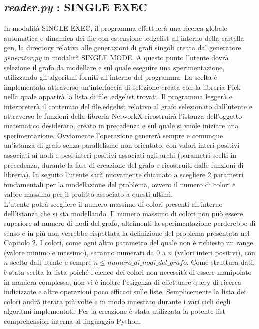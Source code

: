 \subsection{\textit{reader.py} : SINGLE EXEC}
\justify
In modalità SINGLE EXEC, il programma effettuerà una ricerca globale automatica e dinamica dei file con estensione .edgelist all'interno della cartella gen, la directory relativa alle generazioni di grafi singoli creata dal generatore \textit{generator.py} in modalità SINGLE MODE. A questo punto l'utente dovrà selezione il grafo da modellare e sul quale eseguire una sperimentazione, utilizzando gli algoritmi forniti all'interno del programma. La scelta è implementata attraverso un'interfaccia di selezione creata con la libreria Pick nella quale apparirà la lista di file .edgelist trovati. Il programma leggerà e interpreterà il contenuto del file.edgelist relativo al grafo selezionato dall'utente e attraverso le funzioni della libreria NetworkX ricostruirà l'istanza dell'oggetto matematico desiderato, creato in precedenza e sul quale si vuole iniziare una sperimentazione. Ovviamente l'operazione genererà sempre e comunque un'istanza di grafo senza parallelismo non-orientato, con valori interi positivi associati ai nodi e pesi interi positivi associati agli archi (parametri scelti in precedenza, durante la fase di creazione del grafo e ricostruiti dalle funzioni di libreria). In seguito l'utente sarà nuovamente chiamato a scegliere 2 parametri fondamentali per la modellazione del problema, ovvero il numero di colori e valore massimo per il profitto associato a questi ultimi.\\
L'utente potrà scegliere il numero massimo di colori presenti all'interno dell'istanza che si sta modellando. Il numero massimo di colori non può essere superiore al numero di nodi del grafo, altrimenti la sperimentazione perderebbe di senso e in più non verrebbe rispettata la definizione del problema presentata nel Capitolo 2. I colori, come ogni altro parametro del quale non è richiesto un range (valore minimo e massimo), saranno numerati da $0$ a \(n\) (valori interi positivi), con \(n\) scelto dall'utente e sempre \(n \leq numero\_di\_nodi\_del\_grafo\). Come struttura dati, è stata scelta la lista poiché l'elenco dei colori non necessità di essere manipolato in maniera complessa, non vi è inoltre l'esigenza di effettuare query di ricerca indicizzate e altre operazioni poco efficaci sulle liste. Semplicemente la lista dei colori andrà iterata più volte e in modo innestato durante i vari cicli degli algoritmi implementati. Per la creazione è stata utilizzata la potente list comprehension interna al linguaggio Python.\\
